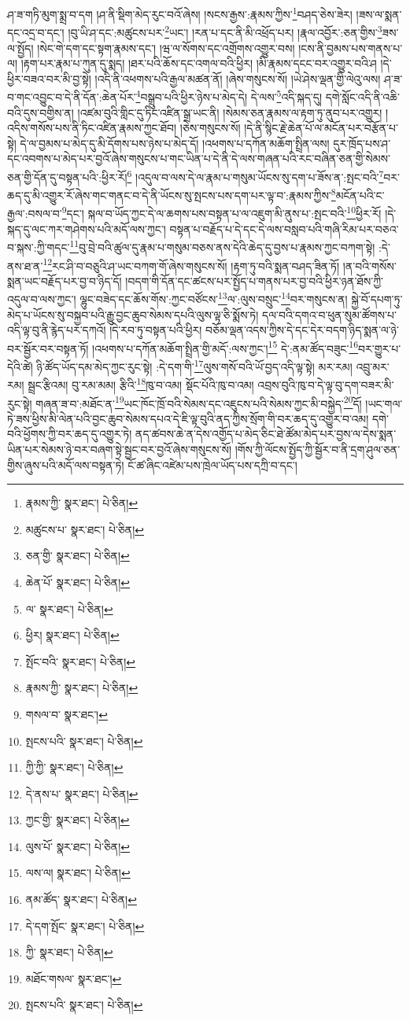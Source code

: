 ཤ་ཟ་གཏི་མུག་སྨྲ་བ་དག །ཤ་ནི་སྡིག་མེད་རུང་བའོ་ཞེས། །སངས་རྒྱས་:རྣམས་ཀྱིས་\footnote{རྣམས་ཀྱི་  སྣར་ཐང་།  པེ་ཅིན། }བཤད་ཅེས་ཟེར། །ཟས་ལ་སྨན་དང་འདྲ་བ་དང་། །བུ་ཡི་ཤ་དང་:མཚུངས་པར་\footnote{མཚུངས་པ་  སྣར་ཐང་།  པེ་ཅིན། }ཡང་། །རན་པ་དང་ནི་མི་འཕྲོད་པར། །རྣལ་འབྱོར་:ཅན་གྱིས་\footnote{ཅན་གྱི་  སྣར་ཐང་།  པེ་ཅིན། }ཟས་ལ་སྤྱོད། །སེང་གེ་དག་དང་སྟག་རྣམས་དང་། །ཝ་ལ་སོགས་དང་འགྲོགས་འགྱུར་བས། །ངས་ནི་བྱམས་པས་གནས་པ་ལ། །རྟག་པར་རྣམ་པ་ཀུན་དུ་སྨད། །ཐར་པའི་ཆོས་དང་འགལ་བའི་ཕྱིར། །མི་རྣམས་དངང་བར་འགྱུར་བའི་ཤ །དེ་ཕྱིར་བཟའ་བར་མི་བྱ་སྟེ། །འདི་ནི་འཕགས་པའི་རྒྱལ་མཚན་ནོ། །ཞེས་གསུངས་སོ། །ཡེ་ཤེས་ལྡན་གྱི་ལེའུ་ལས། ཤ་ཟ་བ་གང་འབྱུང་བ་དེ་ནི་དོན་:ཆེན་པོར་\footnote{ཆེན་པོ་  སྣར་ཐང་།  པེ་ཅིན། }བསྒྲུབ་པའི་ཕྱིར་ཉེས་པ་མེད་དེ། དེ་ལས་\footnote{ལ་  སྣར་ཐང་།  པེ་ཅིན། }འདི་སྐད་དུ། དགེ་སློང་འདི་ནི་འཆི་བའི་དུས་བགྱིས་ན། །འཛམ་བུའི་གླིང་དུ་ཏིང་འཛིན་སྒྲ་ཡང་ནི། །སེམས་ཅན་རྣམས་ལ་རྟག་ཏུ་ནུབ་པར་འགྱུར། །འདིས་གསོས་པས་ནི་ཏིང་འཛིན་རྣམས་ཀྱང་ཐོབ། །ཅེས་གསུངས་སོ། །དེ་ནི་སྙིང་རྗེ་ཆེན་པོ་ལ་མངོན་པར་བརྩོན་པ་སྟེ། དེ་ལ་བྱམས་པ་མེད་དུ་མི་དོགས་པས་ཉེས་པ་མེད་དོ། །འཕགས་པ་དཀོན་མཆོག་སྤྲིན་ལས། དུར་ཁྲོད་པས་ཤ་དང་འབགས་པ་མེད་པར་བྱའོ་ཞེས་གསུངས་པ་གང་ཡིན་པ་དེ་ནི་དེ་ལས་གཞན་པའི་རང་བཞིན་ཅན་གྱི་སེམས་ཅན་གྱི་དོན་དུ་བསྟན་པའི་:ཕྱིར་རོ།\footnote{ཕྱིར།  སྣར་ཐང་།  པེ་ཅིན། } །འདུལ་བ་ལས་དེ་ལ་རྣམ་པ་གསུམ་ཡོངས་སུ་དག་པ་ཟོས་ན་:སྤང་བའི་\footnote{སྤོང་བའི་  སྣར་ཐང་།  པེ་ཅིན། }བར་ཆད་དུ་མི་འགྱུར་རོ་ཞེས་གང་གནང་བ་དེ་ནི་ཡོངས་སུ་སྤངས་པས་དག་པར་ལྟ་བ་:རྣམས་ཀྱིས་\footnote{རྣམས་ཀྱི་  སྣར་ཐང་།  པེ་ཅིན། }མངོན་པའི་ང་རྒྱལ་:བསལ་བ་\footnote{གསལ་བ་  སྣར་ཐང་། }དང་། སྐལ་བ་ཡོད་ཀྱང་དེ་ལ་ཆགས་པས་བསྟན་པ་ལ་འཇུག་མི་ནུས་པ་:སྤང་བའི་\footnote{སྤངས་པའི་  སྣར་ཐང་།  པེ་ཅིན། }ཕྱིར་རོ། །དེ་སྐད་དུ་ལང་ཀར་གཤེགས་པའི་མདོ་ལས་ཀྱང་། བསྟན་པ་བརྗོད་པ་དེ་དང་དེ་ལས་བསླབ་པའི་གཞི་རིམ་པར་བཅའ་བ་སྐས་:ཀྱི་གདང་\footnote{ཀྱི་ཀྱི་  སྣར་ཐང་།  པེ་ཅིན། }བུ་བྲེ་བའི་ཚུལ་དུ་རྣམ་པ་གསུམ་བཅས་ནས་དེའི་ཆེད་དུ་བྱས་པ་རྣམས་ཀྱང་བཀག་སྟེ། :དེ་ནས་ཐ་ན་\footnote{དེ་ནས་པ་  སྣར་ཐང་།  པེ་ཅིན། }རང་ཤི་བ་བཅུའི་ཤ་ཡང་བཀག་གོ་ཞེས་གསུངས་སོ། །རྟག་ཏུ་བའི་སྨན་བཤད་ཟིན་ཏོ། །ན་བའི་གསོས་སྨན་ཡང་བརྗོད་པར་བྱ་བ་ཉིད་དོ། །བདག་གི་དོན་དང་ཚངས་པར་སྤྱོད་པ་གནས་པར་བྱ་བའི་ཕྱིར་ཉན་ཐོས་ཀྱི་འདུལ་བ་ལས་ཀྱང་། ལྷུང་བཟེད་དང་ཆོས་གོས་:ཀྱང་བཙོངས་\footnote{ཀྱང་གྱི་  སྣར་ཐང་།  པེ་ཅིན། }ལ་:ལུས་བསྲུང་\footnote{ལུས་པོ་  སྣར་ཐང་།  པེ་ཅིན། }བར་གསུངས་ན། སྐྱེ་བོ་དཔག་ཏུ་མེད་པ་ཡོངས་སུ་བསྐྱབ་པའི་རྒྱུ་བྱང་ཆུབ་སེམས་དཔའི་ལུས་ལྟ་ཅི་སྨོས་ཏེ། དལ་བའི་དགའ་བ་ཕུན་སུམ་ཚོགས་པ་འདི་ལྟ་བུ་ནི་རྙེད་པར་དཀའོ། །དེ་རབ་ཏུ་བསྟན་པའི་ཕྱིར། བཅོམ་ལྡན་འདས་ཀྱིས་དེ་དང་དེར་བདག་ཉིད་སྨན་ལ་ཉེ་བར་སྦྱོར་བར་བསྟན་ཏོ། །འཕགས་པ་དཀོན་མཆོག་སྤྲིན་གྱི་མདོ་:ལས་ཀྱང་།\footnote{ལས་ལ།  སྣར་ཐང་།  པེ་ཅིན། } དེ་:ནམ་ཚོད་བཟུང་\footnote{ནམ་ཚོད་  སྣར་ཐང་།  པེ་ཅིན། }བར་གྱུར་པ་དེའི་ཚེ། ཉི་ཚོད་ཡོད་དམ་མེད་ཀྱང་རུང་སྟེ། :དེ་དག་གི་\footnote{དེ་དག་སྤོང་  སྣར་ཐང་།  པེ་ཅིན། }ལུས་གསོ་བའི་ཡོ་བྱད་འདི་ལྟ་སྟེ། མར་རམ། འབྲུ་མར་རམ། སྦྲང་རྩིའམ། བུ་རམ་མམ། རྩིའི་\footnote{ཀྱི་  སྣར་ཐང་།  པེ་ཅིན། }ཁུ་བ་འམ། སྡོང་པོའི་ཁུ་བ་འམ། འབྲས་བུའི་ཁུ་བ་དེ་ལྟ་བུ་དག་བཟར་མི་རུང་སྟེ། གཞན་ཟ་བ་:མཐོང་ན་\footnote{མཐོང་གསལ་  སྣར་ཐང་། }ཡང་ཁོང་ཁྲོ་བའི་སེམས་དང་འཇུངས་པའི་སེམས་ཀྱང་མི་བསྐྱེད་\footnote{སྤངས་པའི་  སྣར་ཐང་།  པེ་ཅིན། }དོ། །ཡང་གལ་ཏེ་ཟས་ཕྱིས་མི་ལེན་པའི་བྱང་ཆུབ་སེམས་དཔའ་དེ་ཇི་ལྟ་བུའི་ནད་ཀྱིས་སྲོག་གི་བར་ཆད་དུ་འགྱུར་བ་འམ། དགེ་བའི་ཕྱོགས་ཀྱི་བར་ཆད་དུ་འགྱུར་ཏེ། ནད་ཚབས་ཆེ་ན་དེས་འགྱོད་པ་མེད་ཅིང་ཐེ་ཚོམ་མེད་པར་བྱས་ལ་དེས་སྨན་ཡིན་པར་སེམས་ཉེ་བར་བཞག་སྟེ་སྦྱང་བར་བྱའོ་ཞེས་གསུངས་སོ། །གོས་ཀྱི་ལོངས་སྤྱོད་ཀྱི་སྦྱོར་བ་ནི་དྲག་ཤུལ་ཅན་གྱིས་ཞུས་པའི་མདོ་ལས་བསྟན་ཏེ། ངོ་ཚ་ཞིང་འཛེམ་པས་ཁྲེལ་ཡོད་པས་དཀྲི་བ་དང་། 